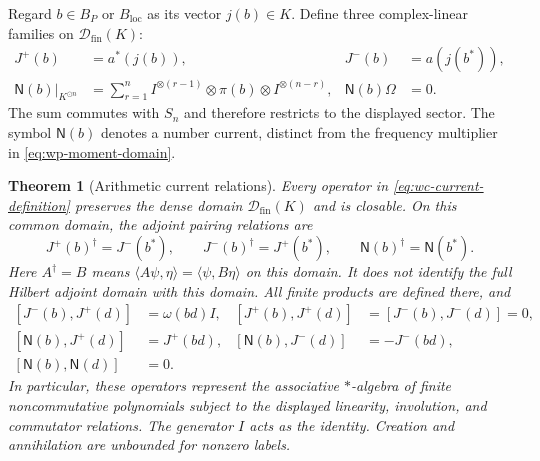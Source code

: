 \documentclass[11pt]{article}
\newtheorem{theorem}{Theorem}[section]
\theoremstyle{definition}
\theoremstyle{remark}
\numberwithin{equation}{section}
\begin{document}
Regard $b\in B_P$ or $B_{\mathrm{loc}}$ as its vector $j(b)\in K$.
Define three complex-linear families on $\mathcal D_{\mathrm{fin}}(K)$:
\begin{equation}
 \begin{aligned}
 J^+(b)&=a^*(j(b)),&
 J^-(b)&=a(j(b^*)),\\
 \mathsf N(b)|_{K^{\odot n}}
 &=\sum_{r=1}^n
 I^{\otimes(r-1)}\otimes\pi(b)\otimes I^{\otimes(n-r)},&
 \mathsf N(b)\Omega&=0.
 \end{aligned}
 \label{eq:wc-current-definition}
\end{equation}
The sum commutes with $S_n$ and therefore restricts to the displayed sector.
The symbol $\mathsf N(b)$ denotes a number current, distinct from the
frequency multiplier in \eqref{eq:wp-moment-domain}.

\begin{theorem}[Arithmetic current relations]
\label{thm:wc-current}
Every operator in \eqref{eq:wc-current-definition} preserves the dense
domain $\mathcal D_{\mathrm{fin}}(K)$ and is closable.
On this common domain, the adjoint pairing relations are
\begin{equation}
 J^+(b)^\dagger=J^-(b^*),\qquad
 J^-(b)^\dagger=J^+(b^*),\qquad
 \mathsf N(b)^\dagger=\mathsf N(b^*).
 \label{eq:wc-current-star}
\end{equation}
Here $A^\dagger=B$ means
$\langle A\psi,\eta\rangle=\langle\psi,B\eta\rangle$ on this domain.
It does not identify the full Hilbert adjoint domain with this domain.
All finite products are defined there, and
\begin{equation}
 \begin{aligned}
 [J^-(b),J^+(d)]&=\omega(bd)I,&
 [J^+(b),J^+(d)]&=[J^-(b),J^-(d)]=0,\\
 [\mathsf N(b),J^+(d)]&=J^+(bd),&
 [\mathsf N(b),J^-(d)]&=-J^-(bd),\\
 [\mathsf N(b),\mathsf N(d)]&=0.&&
 \end{aligned}
 \label{eq:wc-current-relations}
\end{equation}
In particular, these operators represent the associative $*$-algebra
of finite noncommutative polynomials subject to the displayed linearity,
involution, and commutator relations.  The generator $I$ acts as the identity.
Creation and annihilation are unbounded for nonzero labels.
\end{theorem}
\end{document}

